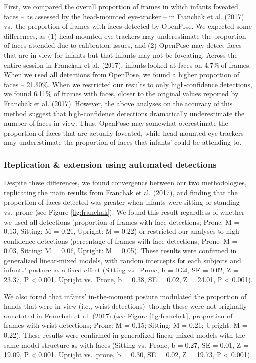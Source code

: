 \documentclass[english,man]{apa6}
\begin{document}
First, we compared the overall proportion of frames in which infants
foveated faces -- as assessed by the head-mounted eye-tracker -- in
Franchak et al. (2017) vs.~the proportion of frames with faces detected
by OpenPose. We expected some differences, as (1) head-mounted
eye-trackers may underestimate the proportion of faces attended due to
calibration issues, and (2) OpenPose may detect faces that are in view
for infants but that infants may not be foveating. Across the entire
session in Franchak et al. (2017), infants looked at faces on 4.7\% of
frames. When we used all detections from OpenPose, we found a higher
proportion of faces -- 21.80\%. When we restricted our results to only
high-confidence detections, we found 6.11\% of frames with faces, closer
to the original values reported by Franchak et al. (2017). However, the
above analyses on the accuracy of this method suggest that
high-confidence detections dramatically underestimate the number of
faces in view. Thus, OpenPose may somewhat overestimate the proportion
of faces that are actually foveated, while head-mounted eye-trackers may
underestimate the proportion of faces that infants' could be attending
to.

\subsubsection{Replication \& extension using automated
detections}\label{replication-extension-using-automated-detections}

Despite these differences, we found convergence between our two
methodologies, replicating the main results from Franchak et al. (2017),
and finding that the proportion of faces detected was greater when
infants were sitting or standing vs.~prone (see Figure
\ref{fig:franchak}). We found this result regardless of whether we used
all detections (proportion of frames with face detections; Prone: M =
0.13, Sitting: M = 0.20, Upright: M = 0.22) or restricted our analyses
to high-confidence detections (percentage of frames with face
detections; Prone: M = 0.03, Sitting: M = 0.06, Upright: M = 0.05).
These results were confirmed in generalized linear-mixed models, with
random intercepts for each subjects and infants' posture as a fixed
effect (Sitting vs.~Prone, b = 0.34, SE = 0.02, Z = 23.37, P \textless{}
0.001. Upright vs.~Prone, b = 0.38, SE = 0.02, Z = 24.01, P \textless{}
0.001).

We also found that infants' in-the-moment posture modulated the
proportion of hands that were in view (i.e., wrist detections), though
these were not originally annotated in Franchak et al. (2017) (see
Figure \ref{fig:franchak}, proportion of frames with wrist detections;
Prone: M = 0.15; Sitting: M = 0.21; Upright: M = 0.22). These results
were confirmed in generalized linear-mixed models with the same model
structure as with faces (Sitting vs.~Prone, b = 0.27, SE = 0.01, Z =
19.09, P \textless{} 0.001. Upright vs.~prone, b = 0.30, SE = 0.02, Z =
19.73, P \textless{} 0.001).
\end{document}
